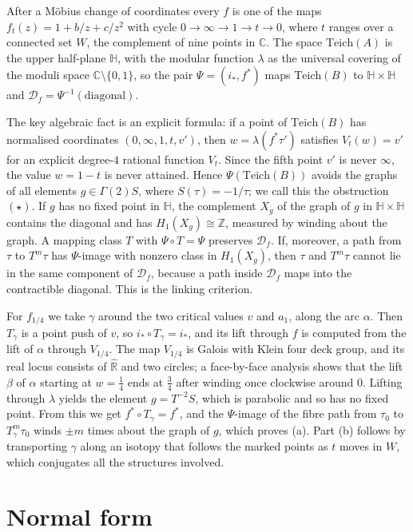 \documentclass[11pt]{article}
\theoremstyle{definition}
\newcommand{\Teich}{\mathrm{Teich}}
\newcommand{\Rh}{\hat{\mathbb R}}
\newcommand{\HH}{\mathbb H}
\newcommand{\D}{\mathcal D}
\begin{document}
After a M\"obius change of coordinates every $f$ is one of the maps $f_t(z)=1+b/z+c/z^2$ with cycle $0\to\infty\to1\to t\to0$, where $t$ ranges over a connected set $W$, the complement of nine points in $\mathbb C$. The space $\Teich(A)$ is the upper half-plane $\HH$, with the modular function $\lambda$ as the universal covering of the moduli space $\mathbb C\setminus\{0,1\}$, so the pair $\Psi=(i_*,f^*)$ maps $\Teich(B)$ to $\HH\times\HH$ and $\D_f=\Psi^{-1}(\text{diagonal})$.

The key algebraic fact is an explicit formula: if a point of $\Teich(B)$ has normalised coordinates $(0,\infty,1,t,v')$, then $w=\lambda(f^*\tau')$ satisfies $V_t(w)=v'$ for an explicit degree-$4$ rational function $V_t$. Since the fifth point $v'$ is never $\infty$, the value $w=1-t$ is never attained. Hence $\Psi(\Teich(B))$ avoids the graphs of all elements $g\in\Gamma(2)S$, where $S(\tau)=-1/\tau$; we call this the obstruction~$(\star)$. If $g$ has no fixed point in $\HH$, the complement $X_g$ of the graph of $g$ in $\HH\times\HH$ contains the diagonal and has $H_1(X_g)\cong\mathbb Z$, measured by winding about the graph. A mapping class $T$ with $\Psi\circ T=\Psi$ preserves $\D_f$. If, moreover, a path from $\tau$ to $T^m\tau$ has $\Psi$-image with nonzero class in $H_1(X_g)$, then $\tau$ and $T^m\tau$ cannot lie in the same component of $\D_f$, because a path inside $\D_f$ maps into the contractible diagonal. This is the linking criterion.

For $f_{1/4}$ we take $\gamma$ around the two critical values $v$ and $a_1$, along the arc $\alpha$. Then $T_\gamma$ is a point push of $v$, so $i_*\circ T_\gamma=i_*$, and its lift through $f$ is computed from the lift of $\alpha$ through $V_{1/4}$. The map $V_{1/4}$ is Galois with Klein four deck group, and its real locus consists of $\Rh$ and two circles; a face-by-face analysis shows that the lift $\beta$ of $\alpha$ starting at $w=\tfrac14$ ends at $\tfrac34$ after winding once clockwise around $0$. Lifting through $\lambda$ yields the element $g=T^{-2}S$, which is parabolic and so has no fixed point. From this we get $f^*\circ T_\gamma=f^*$, and the $\Psi$-image of the fibre path from $\tau_0$ to $T_\gamma^m\tau_0$ winds $\pm m$ times about the graph of $g$, which proves (a). Part (b) follows by transporting $\gamma$ along an isotopy that follows the marked points as $t$ moves in $W$, which conjugates all the structures involved.

\section{Normal form}\label{sec:normal}
\end{document}
